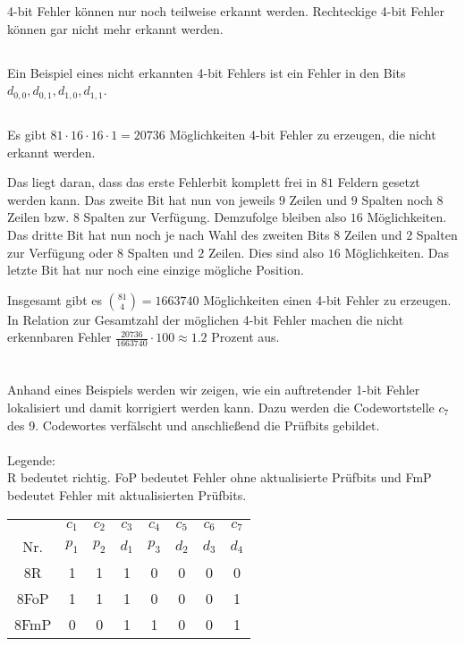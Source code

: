 \documentclass[10pt,a4paper,oneside,ngerman,numbers=noenddot]{scrartcl}
\begin{document}
4-bit Fehler können nur noch teilweise erkannt werden. Rechteckige 4-bit Fehler können gar nicht mehr erkannt werden.
\subsection{} %
Ein Beispiel eines nicht erkannten 4-bit Fehlers ist ein Fehler in den Bits $d_{0,0},d_{0,1},d_{1,0},d_{1,1}$.
\subsection{} %
Es gibt $81 \cdot 16 \cdot 16 \cdot 1 = 20736$ Möglichkeiten 4-bit Fehler zu erzeugen, die nicht erkannt werden. 

Das liegt daran, dass das erste Fehlerbit komplett frei in $81$ Feldern gesetzt werden kann. Das zweite Bit hat nun von jeweils $9$ Zeilen und $9$ Spalten noch $8$ Zeilen bzw. $8$ Spalten zur Verfügung. Demzufolge bleiben also $16$ Möglichkeiten. Das dritte Bit hat nun noch je nach Wahl des zweiten Bits $8$ Zeilen und $2$ Spalten zur Verfügung oder $8$ Spalten und $2$ Zeilen. Dies sind also $16$ Möglichkeiten. Das letzte Bit hat nur noch eine einzige mögliche Position.

Insgesamt gibt es $\binom{81}{4} = 1663740$ Möglichkeiten einen 4-bit Fehler zu erzeugen. In Relation zur Gesamtzahl der möglichen 4-bit Fehler machen die nicht erkennbaren Fehler $\frac{20736}{1663740} \cdot 100 \approx 1.2$ Prozent aus.

\section{}%
\subsection{} %
Anhand eines Beispiels werden wir zeigen, wie ein auftretender 1-bit Fehler lokalisiert und damit korrigiert werden kann. Dazu werden die Codewortstelle $c_{7}$ des 9. Codewortes verfälscht und anschließend die Prüfbits gebildet.\\\\
Legende:\\
R bedeutet richtig. FoP bedeutet Fehler ohne aktualisierte Prüfbits und FmP bedeutet Fehler mit aktualisierten Prüfbits.

\begin{tabular}{cccccccc}
& $c_{1}$ & $c_{2}$ & $c_{3}$ & $c_{4}$ & $c_{5}$ & $c_{6}$ & $c_{7}$ \\
Nr. & $p_{1}$ & $p_{2}$ & $d_{1}$ & $p_{3}$ & $d_{2}$ & $d_{3}$ & $d_{4}$ \\
\hline
8R & 1 & 1 & 1 & 0 & 0 & 0 & 0 \\
8FoP & 1 & 1 & 1 & 0 & 0 & 0 & 1 \\
8FmP & 0 & 0 & 1 & 1 & 0 & 0 & 1
\end{tabular}
\end{document}
